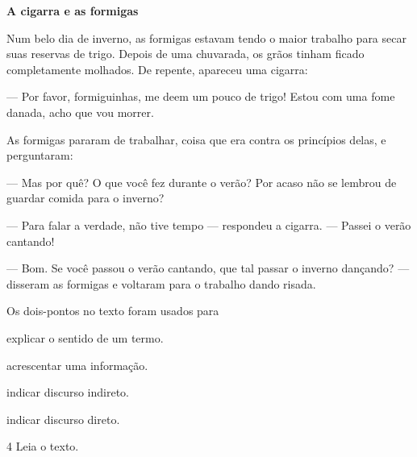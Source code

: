 \begin{myquote}
\textbf{A cigarra e as formigas}

Num belo dia de inverno, as formigas estavam tendo o maior
trabalho para secar suas reservas de trigo. Depois de uma
chuvarada, os grãos tinham ficado completamente molhados. De
repente, apareceu uma cigarra:

--- Por favor, formiguinhas, me deem um pouco de
trigo! Estou com uma fome danada, acho que vou morrer.

As formigas pararam de trabalhar, coisa que era contra
os princípios delas, e perguntaram:

--- Mas por quê? O que você fez durante o verão? Por
acaso não se lembrou de guardar comida para o inverno?

--- Para falar a verdade, não tive tempo --- respondeu
a cigarra. --- Passei o verão cantando!

--- Bom. Se você passou o verão cantando, que tal
passar o inverno dançando? --- disseram as formigas e
voltaram para o trabalho dando risada.

\end{myquote}

Os dois-pontos no texto foram usados para

\begin{escolha}
\item explicar o sentido de um termo.

\item acrescentar uma informação.

\item indicar discurso indireto.

\item indicar discurso direto.
\end{escolha}



\num{4} Leia o texto.

